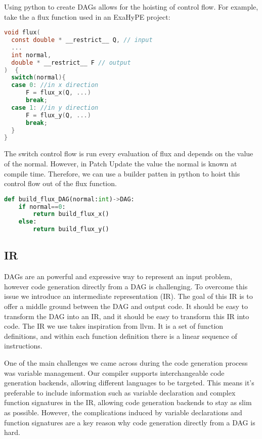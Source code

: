 Using python to create DAGs allows for the hoisting of control flow.
For example, take the a flux function used in an ExaHyPE project:
\begin{lstlisting}[language=c]
void flux(
  const double * __restrict__ Q, // input
  ...
  int normal,
  double * __restrict__ F // output
)  {
  switch(normal){  
  case 0: //in x direction
	  F = flux_x(Q, ...)
	  break;
  case 1: //in y direction
	  F = flux_y(Q, ...)
	  break;
  }  
}
\end{lstlisting}
The switch control flow is run every evaluation of flux and depends on the value of the normal.
However, in Patch Update the value the normal is known at compile time.
Therefore, we can use a builder patten in python to hoist this control flow out of the flux function.
\begin{lstlisting}[language=python]
def build_flux_DAG(normal:int)->DAG:
    if normal==0:
        return build_flux_x()
    else:
        return build_flux_y()
\end{lstlisting}




\subsection{IR}


DAGs are an powerful and expressive way to represent an input problem, however code generation directly from a DAG is challenging.
To overcome this issue we introduce an intermediate representation (IR).
The goal of this IR is to offer a middle ground between the DAG and output code.
It should be easy to transform the DAG into an IR, and it should be easy to transform this IR into code.
The IR we use takes inspiration from llvm.
It is a set of function definitions, and within each function definition there is a linear sequence of instructions.

One of the main challenges we came across during the code generation process was variable management.
Our compiler supports interchangeable code generation backends, allowing different languages to be targeted.
This means it's preferable to include information such as variable declaration and complex function signatures in the IR, allowing code generation backends to stay as slim as possible.
However, the complications induced by variable declarations and function signatures are a key reason why code generation directly from a DAG is hard.   


